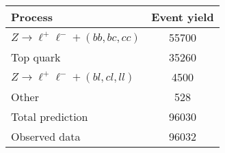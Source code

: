 %

\begin{tabular}{lS[table-format=5.0(4)]}
  \toprule
  Process & {Event yield} \\
  \midrule
  $Z \to \ell^+\ell^- + (bb,bc,cc)$ & 55700  \\
  Top quark & 35260  \\
  $Z \to \ell^+\ell^- + (bl,cl,ll)$ & 4500  \\
  Other & 528  \\
  \midrule
  Total prediction & 96030  \\
  \midrule
  Observed data & 96032 \\
  \bottomrule
\end{tabular}

